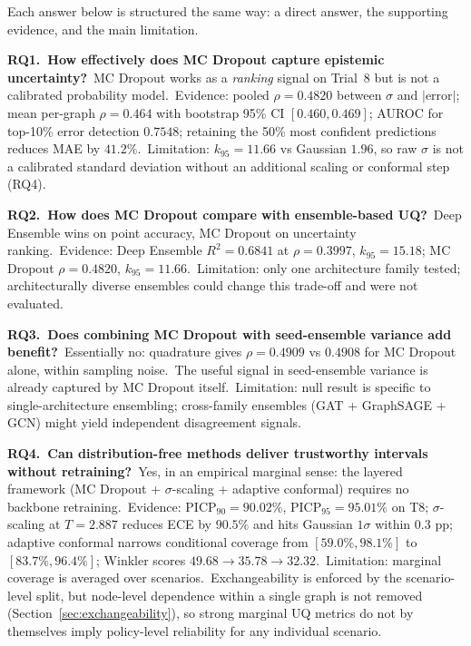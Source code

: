 Each answer below is structured the same way: a direct answer, the supporting evidence, and the main limitation.

\textbf{RQ1.\ How effectively does MC Dropout capture epistemic uncertainty?}\ MC Dropout works as a \emph{ranking} signal on Trial~8 but is not a calibrated probability model.\ Evidence: pooled $\rho = 0.4820$ between $\sigma$ and $|\text{error}|$; mean per-graph $\rho = 0.464$ with bootstrap 95\% CI $[0.460, 0.469]$; AUROC for top-10\% error detection $0.7548$; retaining the 50\% most confident predictions reduces MAE by $41.2\%$.\ Limitation: $k_{95} = 11.66$ vs Gaussian $1.96$, so raw $\sigma$ is not a calibrated standard deviation without an additional scaling or conformal step (RQ4).

\textbf{RQ2.\ How does MC Dropout compare with ensemble-based UQ?}\ Deep Ensemble wins on point accuracy, MC Dropout on uncertainty ranking.\ Evidence: Deep Ensemble $R^2 = 0.6841$ at $\rho = 0.3997$, $k_{95} = 15.18$; MC Dropout $\rho = 0.4820$, $k_{95} = 11.66$.\ Limitation: only one architecture family tested; architecturally diverse ensembles could change this trade-off and were not evaluated.

\textbf{RQ3.\ Does combining MC Dropout with seed-ensemble variance add benefit?}\ Essentially no: quadrature gives $\rho = 0.4909$ vs $0.4908$ for MC Dropout alone, within sampling noise.\ The useful signal in seed-ensemble variance is already captured by MC Dropout itself.\ Limitation: null result is specific to single-architecture ensembling; cross-family ensembles (GAT + GraphSAGE + GCN) might yield independent disagreement signals.

\textbf{RQ4.\ Can distribution-free methods deliver trustworthy intervals without retraining?}\ Yes, in an empirical marginal sense: the layered framework (MC Dropout + $\sigma$-scaling + adaptive conformal) requires no backbone retraining.\ Evidence: $\mathrm{PICP}_{90} = 90.02\%$, $\mathrm{PICP}_{95} = 95.01\%$ on T8; $\sigma$-scaling at $T = 2.887$ reduces ECE by $90.5\%$ and hits Gaussian $1\sigma$ within $0.3$ pp; adaptive conformal narrows conditional coverage from $[59.0\%, 98.1\%]$ to $[83.7\%, 96.4\%]$; Winkler scores $49.68 \to 35.78 \to 32.32$.\ Limitation: marginal coverage is averaged over scenarios.\ Exchangeability is enforced by the scenario-level split, but node-level dependence within a single graph is not removed (Section~\ref{sec:exchangeability}), so strong marginal UQ metrics do not by themselves imply policy-level reliability for any individual scenario.

